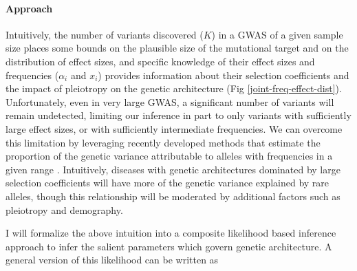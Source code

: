 \documentclass[11pt]{article}
\begin{document}
\paragraph{Approach}
 Intuitively, the number of variants discovered ($K$) in a GWAS of a given sample size places some bounds on the plausible size of the mutational target and on the distribution of effect sizes, and specific knowledge of their effect sizes and frequencies ($\alpha_i$ and $x_i$) provides information about their selection coefficients and the impact of pleiotropy on the genetic architecture (Fig \ref{joint-freq-effect-dist}). Unfortunately, even in very large GWAS, a significant number of variants will remain undetected, limiting our inference in part to only variants with sufficiently large effect sizes, or with sufficiently intermediate frequencies. We can overcome this limitation by leveraging recently developed methods that estimate the proportion of the genetic variance attributable to alleles with frequencies in a given range \cite{Visscher,others}. Intuitively, diseases with genetic architectures dominated by large selection coefficients will have more of the genetic variance explained by rare alleles, though this relationship will be moderated by additional factors such as pleiotropy and demography. 

\setlength{\abovedisplayskip}{15pt}
\setlength{\belowdisplayskip}{5pt}
\setlength{\jot}{-17pt}
I will formalize the above intuition into a composite likelihood based inference approach to infer the salient parameters which govern genetic architecture. A general version of this likelihood can be written as
\end{document}
